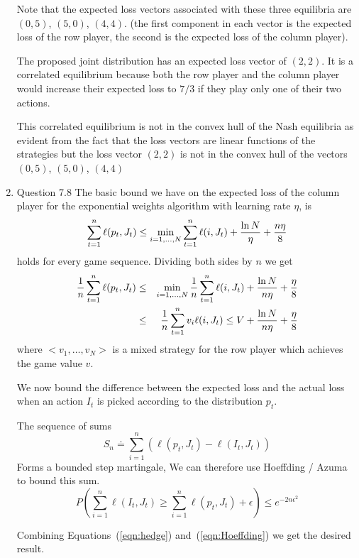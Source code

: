 \documentclass[12pt]{article}
\begin{document}
\begin{enumerate}
Note that the expected loss vectors associated with these three
equilibria are $(0,5)$, $(5,0)$, $(4,4)$. (the first component in each
vector is the expected loss of the row player, the second is the
expected loss of the column player).

The proposed joint distribution has an expected loss vector of
$(2,2)$. It is a correlated equilibrium because both the row player
and the column player would increase their expected loss to $7/3$ if
they play only one of their two actions.

This correlated equilibrium is not in the convex hull of the Nash
equilibria as evident from the fact that the loss vectors are linear
functions of the strategies but the loss vector $(2,2)$ is
not in the convex hull of the vectors $(0,5)$, $(5,0)$, $(4,4)$

\item {Question 7.8}
The basic bound we have on the expected loss of the column player 
for the exponential weights algorithm with learning rate $\eta$, is
\[
\sum_{t=1}^n \ell(p_{t},J_t) \leq 
\min_{i=1,\ldots,N} \sum_{t=1}^n \ell(i,J_t) + {\ln N \over \eta} + {n \eta \over 8} 
\]
holds for every game sequence. Dividing both sides by $n$ we get
\begin{eqnarray} 
{1 \over n} \sum_{t=1}^n \ell(p_{t},J_t) &\leq& 
\min_{i=1,\ldots,N} \frac{1}{n} \sum_{t=1}^n \ell(i,J_t) + {\ln N
  \over n \eta} + {\eta \over 8} \nonumber \\
&\leq& \frac{1}{n} \sum_{t=1}^n v_i \ell(i,J_t)
\leq V + {\ln N \over n \eta} + {\eta \over 8} \label{eqn:hedge}
\end{eqnarray}
where $<v_1,\ldots,v_N>$ is a mixed strategy for the row player which
achieves the game value $v$.

We now bound the difference between the expected loss and the
actual loss when an action $I_t$ is picked according to the
distribution $p_t$. 

The sequence of sums 
\[
S_n \doteq \sum_{i=1}^n (\ell(p_t,J_t) - \ell(I_t,J_t))
\]
Forms a bounded step martingale, We can therefore use Hoeffding /
Azuma to bound this sum. 
\begin{equation} \label{eqn:Hoeffding}
P\left( \sum_{i=1}^n \ell(I_t,J_t) \geq \sum_{i=1}^n \ell(p_t,J_t)
  +\epsilon \right)
\leq e^{-2n\epsilon^2}
\end{equation}

Combining Equations~(\ref{eqn:hedge}) and~(\ref{eqn:Hoeffding}) we get
the desired result.

\end{enumerate}
\end{document}
